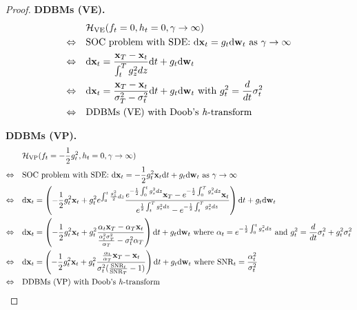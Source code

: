 \begin{proof} \textbf{DDBMs (VE).} 
\begin{align*}
&\mathcal{H}_\text{VE}(f_t=0, h_t=0, \gamma \rightarrow \infty) \\
\Leftrightarrow \quad & \text{SOC problem with SDE: }\mathrm{d} \mathbf{x}_t = g_t \mathrm{d} \mathbf{w}_t \text{ as $\gamma \rightarrow \infty$} \\
\Leftrightarrow \quad & \mathrm{d} \mathbf{x}_t = \frac{\mathbf{x}_T - \mathbf{x}_t}{\int_{t}^{T} g_z^2 dz} \mathrm{d}t + g_t \mathrm{d} \mathbf{w}_t  \\
\Leftrightarrow \quad & \mathrm{d} \mathbf{x}_t = \frac{\mathbf{x}_T - \mathbf{x}_t}{\sigma_T^2 - \sigma_t^2} \mathrm{d}t + g_t \mathrm{d} \mathbf{w}_t \text{ with $g^2_t = \frac{d}{dt} \sigma_t^2 $} \\
\Leftrightarrow \quad & \text{DDBMs (VE) with Doob's \textit{h}-transform}
\end{align*}

\textbf{DDBMs (VP).}
\begin{align*}
&\mathcal{H}_\text{VP}(f_t=-\frac{1}{2} g^2_t, h_t=0, \gamma \rightarrow \infty) \\
\Leftrightarrow \quad & \text{SOC problem with SDE: }\mathrm{d} \mathbf{x}_t = -\frac{1}{2} g_t^2 \mathbf{x}_t \mathrm{d} t + g_t \mathrm{d} \mathbf{w}_t \text{ as $\gamma \rightarrow \infty$}\\
\Leftrightarrow \quad & \mathrm{d} \mathbf{x}_t = \left( -\frac{1}{2} g_t^2 \mathbf{x}_t + g^2_t e^{\int_{0}^{t} \frac{g^2_z}{2} dz}\frac{e^{-\frac{1}{2}\int_{0}^{t} g_z^2 dz}\mathbf{x}_T - e^{-\frac{1}{2}\int_{0}^{T} g_z^2 dz}\mathbf{x}_t}{e^{\frac{1}{2}\int_{t}^{T} g_z^2 dz} - e^{-\frac{1}{2}\int_{t}^{T} g_z^2 dz}} \right) \mathrm{d}t + g_t \mathrm{d} \mathbf{w}_t \\
\Leftrightarrow \quad & \mathrm{d} \mathbf{x}_t = \left( -\frac{1}{2} g_t^2 \mathbf{x}_t + g^2_t\frac{\alpha_t\mathbf{x}_T - \alpha_T\mathbf{x}_t}{\frac{\alpha_t^2\sigma_T^2}{\alpha_T} - \sigma_t^2\alpha_T} \right) \mathrm{d}t + g_t \mathrm{d} \mathbf{w}_t \ \text{where $\alpha_t = e^{-\frac{1}{2}\int_{0}^{t} g_z^2 dz}$ and $g^2_t = \frac{d}{dt}\sigma^2_t + g^2_t$}\sigma^2_t \\
\Leftrightarrow \quad & \mathrm{d} \mathbf{x}_t = \left( -\frac{1}{2} g_t^2 \mathbf{x}_t + g^2_t\frac{\frac{\alpha_t}{\alpha_T}\mathbf{x}_T - \mathbf{x}_t}{\sigma_t^2(\frac{\text{SNR}_t}{\text{SNR}_T} - 1)} \right) \mathrm{d}t + g_t \mathrm{d} \mathbf{w}_t \ \text{where $\text{SNR}_t = \frac{\alpha^2_t}{\sigma^2_t} $}\\
\Leftrightarrow \quad & \text{DDBMs (VP) with Doob's \textit{h}-transform}
\end{align*}


\end{proof}
